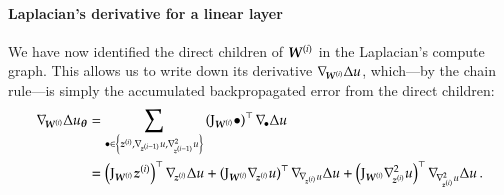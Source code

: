 \paragraph{Laplacian's derivative for a linear layer} We have now identified the direct children of ${\boldsymbol{W}}^{(i)}$ in the Laplacian's compute graph.
This allows us to write down its derivative $\nabla_{\!{{\boldsymbol{W}}^{(i)}}} \Delta u$, which---by the chain rule---is simply the accumulated backpropagated error from the direct children:
\begin{align}\label{eq:laplacian-gradient}
  \begin{split}
    \grad{\mW^{(i)}} \Delta u_{\vtheta}
    &=
      \sum_{\bullet \in \left\{ \vz^{(i)}, \grad{\vz^{(i-1)}}u, \gradsquared{\vz^{(i-1)}}u \right\}}
      \left(
      \jac_{\mW^{(i)}}\bullet
      \right)^{\top}
      \grad{\bullet}\Delta u
    \\
    &=
      \left(
      \jac_{\mW^{(i)}}\vz^{(i)}
      \right)^{\top}
      \grad{\vz^{(i)}}\Delta u
      +
      \left(
      \jac_{\mW^{(i)}}\grad{\vz^{(i)}}u
      \right)^{\top}
      \grad{\grad{\vz^{(i)}}u}\Delta u
      +
      \left(
      \jac_{\mW^{(i)}}\gradsquared{\vz^{(i)}}u
      \right)^{\top}
      \grad{\gradsquared{\vz^{(i)}}u}\Delta u\,.
  \end{split}
\end{align}

